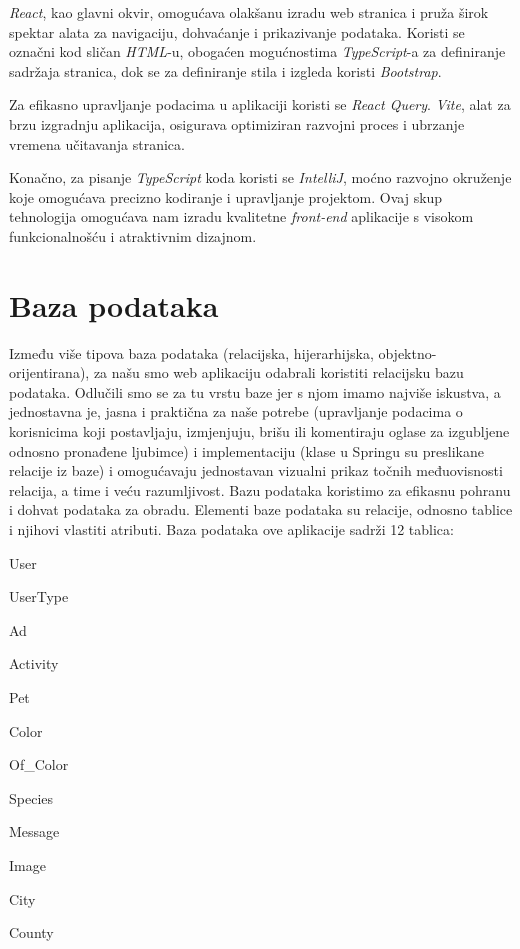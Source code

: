 \textit{React}, kao glavni okvir, omogućava olakšanu izradu web stranica i pruža širok spektar alata za navigaciju, dohvaćanje i prikazivanje podataka. Koristi se označni kod sličan \textit{HTML}-u, obogaćen mogućnostima \textit{TypeScript}-a za definiranje sadržaja stranica, dok se za definiranje stila i izgleda koristi \textit{Bootstrap}.

Za efikasno upravljanje podacima u aplikaciji koristi se \textit{React Query}. \textit{Vite}, alat za brzu izgradnju aplikacija, osigurava optimiziran razvojni proces i ubrzanje vremena učitavanja stranica.

Konačno, za pisanje \textit{TypeScript} koda koristi se \textit{IntelliJ}, moćno razvojno okruženje koje omogućava precizno kodiranje i upravljanje projektom. Ovaj skup tehnologija omogućava nam izradu kvalitetne \textit{front-end} aplikacije s visokom funkcionalnošću i atraktivnim dizajnom.\\
		
		
				
		\section{Baza podataka}
			
		Između više tipova baza podataka (relacijska, hijerarhijska, objektno-orijentirana), za našu smo web aplikaciju odabrali koristiti relacijsku bazu podataka. Odlučili smo se za tu vrstu baze jer s njom imamo najviše iskustva, a jednostavna je, jasna i praktična za naše potrebe (upravljanje podacima o korisnicima koji postavljaju, izmjenjuju, brišu ili komentiraju oglase za izgubljene odnosno pronađene ljubimce) i implementaciju (klase u Springu su preslikane relacije iz baze) i omogućavaju jednostavan vizualni prikaz točnih međuovisnosti relacija, a time i veću razumljivost. Bazu podataka koristimo za efikasnu pohranu i dohvat podataka za obradu. Elementi baze podataka su relacije, odnosno tablice i njihovi vlastiti atributi. Baza podataka ove aplikacije sadrži 12 tablica:
		
		\begin{packed_item}
			\item User
			\item UserType
			\item Ad
			\item Activity
			\item Pet
			\item Color
			\item Of\_Color
			\item Species
			\item Message
			\item Image
			\item City
			\item County
		\end{packed_item}

